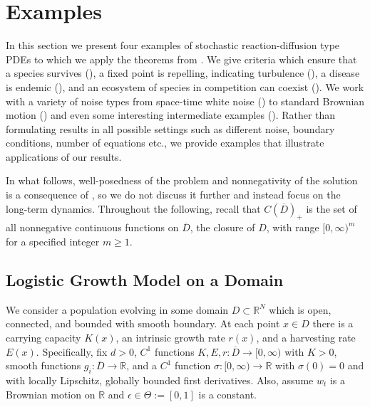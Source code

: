 \documentclass[final]{amsart}
\numberwithin{thm}{section}
\numberwithin{equation}{section}
\newcommand{\R}{\mathbb{R}}
\newcommand{\cdom}{C(\overline D)_+}
\begin{document}
    
    












\section{Examples}\label{examples}
In this section we present four examples of stochastic reaction-diffusion type PDEs to which we apply the theorems from . We give criteria which ensure that a species survives (), a fixed point is repelling, indicating turbulence (), a disease is endemic (), and an ecosystem of species in competition can coexist (). We work with a variety of noise types from space-time white noise () to standard Brownian motion () and even some interesting intermediate examples  (). Rather than formulating results in all possible settings such as different noise, boundary conditions, number of equations etc., 
we provide examples that illustrate applications of our results. 

In what follows, well-posedness of the problem and nonnegativity of the solution is a consequence of , so we do not discuss it further and instead focus on the long-term dynamics. Throughout the following, recall that $\cdom$ is the set of all nonnegative continuous functions on $\overline D$, the closure of $D$,
with range $[0, \infty)^m$ for a specified integer $m \geq 1$.

\subsection{Logistic Growth Model on a Domain}\label{example-logistic}
We consider a population evolving in some domain $D \subset \R^N$ which is open, connected, and bounded with smooth boundary. At each point $x \in D$ there is a carrying capacity $K(x)$, an intrinsic growth rate $r(x)$, and a harvesting rate $E(x)$. 
Specifically, 
fix $d > 0$, $C^1$ functions $K,E,r: \overline D \to [0,\infty)$  with $K > 0$, 
smooth functions 
$g_i : \overline D \to \R$, and a $C^1$ function $\sigma: [0,\infty) \to \R$ with $\sigma(0) = 0$ and with locally Lipschitz, globally bounded first derivatives. Also, assume $w_t$ is a Brownian motion on $\R$ and $\epsilon \in \Theta := [0,1]$ is a constant.
\end{document}
